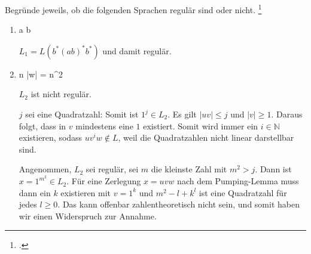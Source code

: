 \documentclass{bschlangaul-aufgabe}
\begin{document}

\let\m=\bMenge

Begründe jeweils, ob die folgenden Sprachen regulär sind oder nicht.
\footcite{theo:ab:1}

\begin{enumerate}


\item \bAusdruck[L_1]
{w \in \m{a, b}^* }
{ a  b}

\begin{bAntwort}
$L_1 = L(b^* (ab)^* b^*)$ und damit regulär.
\end{bAntwort}


\item {}
{\exists n \in {}  |w| = n^2}

\begin{bAntwort}
$L_2$ ist nicht regulär.


$j$ sei eine Quadratzahl: Somit ist $1^j \in L_2$. Es gilt $|uv| \leq j$
und $|v| \geq 1$. Daraus folgt, dass in $v$ mindestens eine $1$
existiert. Somit wird immer ein $i \in \mathbb{N}$ existieren, sodass
$uv^iw \notin L$, weil die Quadratzahlen nicht linear darstellbar sind.


Angenommen, $L_2$ sei regulär, sei $m$ die kleinste Zahl mit $m^2 > j$.
Dann ist $x = 1^{m^2} \in L_2$. Für eine Zerlegung $x = uvw$ nach dem
Pumping-Lemma muss dann ein $k$ existieren mit $v = 1^k$ und $m^2 - l +
k^l$ ist eine Quadratzahl für jedes $l \geq 0$. Das kann offenbar
zahlentheoretisch nicht sein, und somit haben wir einen Widerspruch zur
Annahme.
\end{bAntwort}


\end{enumerate}
\end{document}
